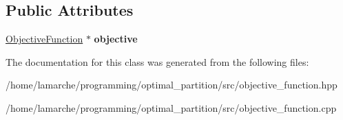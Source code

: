 \subsection*{Public Attributes}
\begin{DoxyCompactItemize}
\item 
\hypertarget{classObjectiveValue_a12509b8168294b3b1a76ec092dd48a3a}{\hyperlink{classObjectiveFunction}{Objective\-Function} $\ast$ {\bfseries objective}}\label{classObjectiveValue_a12509b8168294b3b1a76ec092dd48a3a}

\end{DoxyCompactItemize}


The documentation for this class was generated from the following files\-:\begin{DoxyCompactItemize}
\item 
/home/lamarche/programming/optimal\-\_\-partition/src/objective\-\_\-function.\-hpp\item 
/home/lamarche/programming/optimal\-\_\-partition/src/objective\-\_\-function.\-cpp\end{DoxyCompactItemize}
